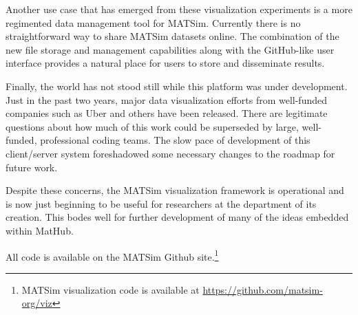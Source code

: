 Another use case that has emerged from these visualization experiments is a more regimented data management tool for MATSim. Currently there is no straightforward way to share MATSim datasets online. The combination of the new file storage and management capabilities along with the GitHub-like user interface provides a natural place for users to store and disseminate results.

Finally, the world has not stood still while this platform was under development. Just in the past two years, major data visualization efforts from well-funded companies such as Uber and others have been released. There are legitimate questions about how much of this work could be superseded by large, well-funded, professional coding teams. The slow pace of development of this client/server system foreshadowed some necessary changes to the roadmap for future work.

Despite these concerns, the MATSim visualization framework is operational and is now just beginning to be useful for researchers at the department of its creation. This bodes well for further development of many of the ideas embedded within MatHub.

All code is available on the MATSim Github site.\footnote{MATSim visualization code is available at \url{https://github.com/matsim-org/viz}}
